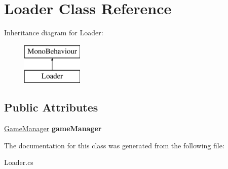 \hypertarget{class_loader}{}\section{Loader Class Reference}
\label{class_loader}
Inheritance diagram for Loader\+:\begin{figure}[H]
\begin{center}
\leavevmode
\includegraphics[height=2.000000cm]{class_loader}
\end{center}
\end{figure}
\subsection*{Public Attributes}
\begin{DoxyCompactItemize}
\item 
\mbox{\label{class_loader_a4eee44244b0fa6a5708e2ffbee772403}} 
\mbox{\hyperlink{class_game_manager}{Game\+Manager}} {\bfseries game\+Manager}
\end{DoxyCompactItemize}


The documentation for this class was generated from the following file\+:\begin{DoxyCompactItemize}
\item 
Loader.\+cs\end{DoxyCompactItemize}

